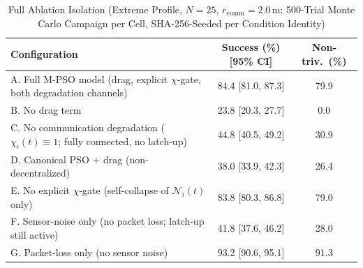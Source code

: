 \documentclass[conference]{IEEEtran}
\begin{document}
\begin{table}[t]
\renewcommand{\arraystretch}{0.85}
\caption{Full Ablation Isolation (Extreme Profile, $N=25$, $r_{\text{comm}}=2.0\,\text{m}$; 500-Trial Monte Carlo Campaign per Cell, SHA-256-Seeded per Condition Identity)}
\label{tab:ablation}
\centering
\scriptsize
\setlength{\tabcolsep}{3pt}
\begin{tabular}{@{}p{} c c@{}}
\toprule
\textbf{Configuration} & \textbf{Success (\%) [95\% CI]} & \textbf{Non-triv.\ (\%)} \\
\midrule
A. Full M-PSO model (drag, explicit $\chi$-gate, both degradation channels) & 84.4 [81.0, 87.3] & 79.9 \\
B. No drag term & 23.8 [20.3, 27.7] & 0.0 \\
C. No communication degradation ($\chi_i(t)\!\equiv\!1$; fully connected, no latch-up) & 44.8 [40.5, 49.2] & 30.9 \\
D. Canonical PSO $+$ drag (non-decentralized) & 38.0 [33.9, 42.3] & 26.4 \\
E. No explicit $\chi$-gate (self-collapse of $\mathcal{N}_i(t)$ only) & 83.8 [80.3, 86.8] & 79.0 \\
F. Sensor-noise only (no packet loss; latch-up still active) & 41.8 [37.6, 46.2] & 28.0 \\
G. Packet-loss only (no sensor noise) & 93.2 [90.6, 95.1] & 91.3 \\
\bottomrule
\end{tabular}


\end{table}
\end{document}
